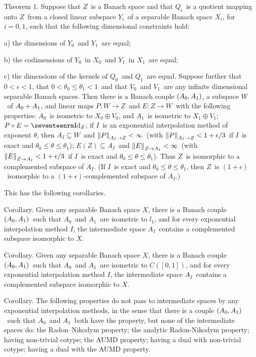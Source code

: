 \proclaim Theorem 1. Suppose that $Z$\ is a Banach space
and that $Q_i$\ is a quotient mapping onto $Z$\ from a closed
linear subspace $Y_i$\ of a separable Banach space $X_i$, for $i=0,1$, such that
the following dimensional constraints hold:
\item{a)} the dimensions of $Y_0$\ and $Y_1$\ are equal;
\item{b)} the codimensions of $Y_0$\ in $X_0$\ and $Y_1$\ in $X_1$\ are equal;
\item{c)} the dimensions of the kernels of $Q_0$\ and $Q_1$\ are equal.
\moreproclaim\noindent
Suppose further that $0<\epsilon<1$, that $0<\theta_0\le \theta_1<1$\ and that
$V_0$\ and $V_1$\ are any infinite dimensional separable Banach spaces. 
\moreproclaim
Then there is a Banach couple $(A_0,A_1)$, a subspace $W$\ of $A_0 + A_1$, and
linear maps $P:W\to Z$\ and $E:Z\to W$\ with the following properties: 
\itemi
$A_0$\ is isometric to $X_0\oplus V_0$, and $A_1$\ is isometric to $X_1\oplus
V_1$; 
\itemii $P\circ E = \Id_Z$;
\moreproclaim\noindent
if $I$\ is an exponential interpolation method of exponent $\theta$, then
\itemiii $A_I \subseteq W$\ and $\left\| P \right\|_{A_I\to Z} < \infty$\ (with $\left\| P \right\|_{A_I\to Z} < 1+\epsilon/3 $\ if $I$\ is exact and
$\theta_0\le\theta\le\theta_1$);
\itemiv $E(Z)\subseteq A_I$\ and $\left\| E \right\|_{Z\to A_I} < \infty$\ (with $\left\| E \right\|_{Z\to A_I} < 1+\epsilon/3 $\ if $I$\ is exact and
$\theta_0\le\theta\le\theta_1$).
\moreproclaim\noindent
Thus $Z$\ is isomorphic to a complemented subspace of $A_I$. (If $I$\ is
exact and $\theta_0\le\theta\le\theta_1$, then $Z$\ is $(1+\epsilon)$\
isomorphic to a $(1+\epsilon)$-complemented subspace of $A_I$.)

This has the following corollaries.

\proclaim Corollary. Given any separable Banach space $X$, there is a Banach
couple $(A_0,A_1)$\ such that $A_0$\ and $A_1$\ are isometric to $l_1$, and for
every exponential interpolation method $I$, the intermediate space $A_I$\
contains a complemented subspace isomorphic to $X$.

\proclaim Corollary. Given any separable Banach space $X$, there is a
Banach couple $(A_0,A_1)$\ such that $A_0$\ and $A_1$\ are isometric to
$C([0,1])$, and for every exponential interpolation method $I$, the intermediate
space $A_I$\ contains a complemented subspace isomorphic to $X$.

\proclaim Corollary. The following properties do not pass to
intermediate spaces by any exponential interpolation methods, in the sense
that there is a couple $(A_0,A_1)$\ such that $A_0$\ and $A_1$\ both have the
property, but none of the intermediate spaces do:
\itemi the Radon--Nikodym property;
\itemii the analytic Radon-Nikodym property;
\itemiii having non-trivial cotype;
\itemiv the AUMD property;
\itemv having a dual with non-trivial cotype;
\itemvi having a dual with the AUMD property.


